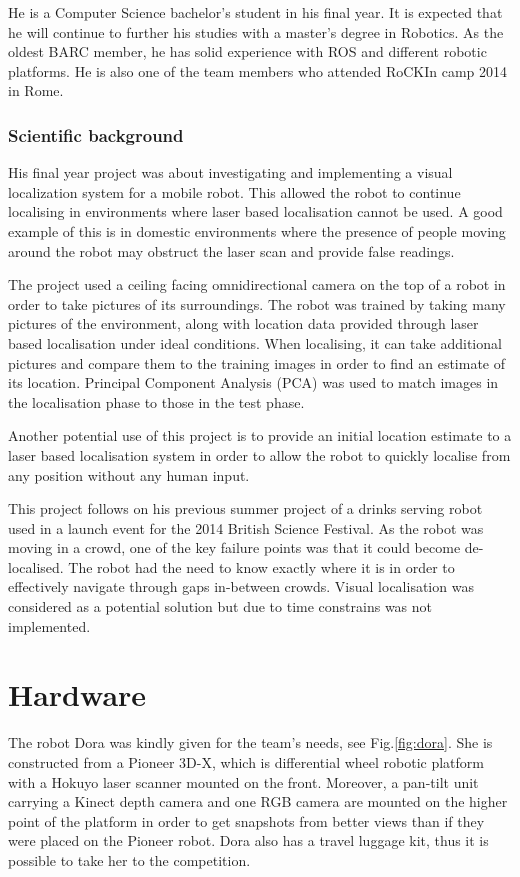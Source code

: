 \documentclass[conference]{IEEEtran}
\begin{document}
He is a Computer Science bachelor's student in his final year. It is expected that he will continue to further his studies with a master's degree in Robotics. As the oldest BARC member, he has solid experience with ROS and different robotic platforms. He is also one of the team members who attended RoCKIn camp 2014 in Rome.

\subsubsection*{Scientific background}
 
His final year project was about investigating and implementing a visual localization system for a mobile robot. This allowed the robot to continue localising in environments where laser based localisation cannot be used. A good example of this is in domestic environments where the presence of people moving around the robot may obstruct the laser scan and provide false readings.
 
The project used a ceiling facing omnidirectional camera on the top of a robot in order to take pictures of its surroundings.
The robot was trained by taking many pictures of the environment, along with location data provided through laser based localisation under ideal conditions. When localising, it can take additional pictures and compare them to the training images in order to find an estimate of its location. Principal Component Analysis (PCA) was used to match images in the localisation phase to those in the test phase. 

Another potential use of this project is to provide an initial location estimate to a laser based localisation system in order to allow the robot to quickly localise from any position without any human input.

This project follows on his previous summer project of a drinks serving robot used in a launch event for the 2014 British Science Festival. As the robot was moving in a crowd, one of the key failure points was that it could become de-localised. The robot had the need to know exactly where it is in order to effectively navigate through gaps in-between crowds. Visual localisation was considered as a potential solution but due to time constrains was not implemented.

\section{\label{sec:hardware}Hardware}
The robot Dora was kindly given for the team's needs, see Fig.\ref{fig:dora}. She is constructed from a Pioneer 3D-X, which is differential wheel robotic platform with a Hokuyo laser scanner mounted on the front. Moreover, a pan-tilt unit carrying a Kinect depth camera and one RGB camera are mounted on the higher point of the platform in order to get snapshots from better views than if they were placed on the Pioneer robot. Dora also has a travel luggage kit, thus it is possible to take her to the competition.
\end{document}
